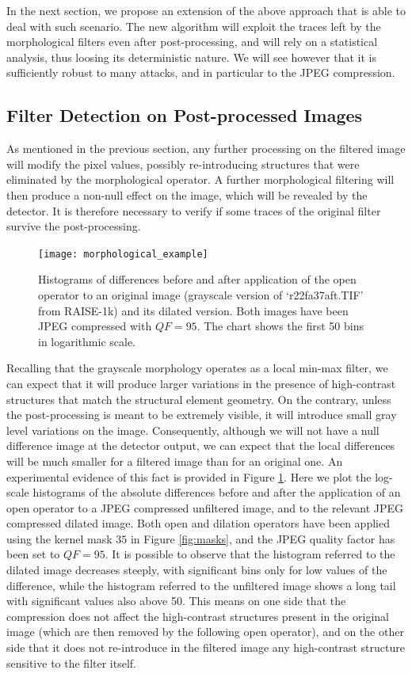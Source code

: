 \documentclass{ieeeaccess}
\begin{document}
In the next section, we propose an extension of the above approach that is able to deal with such scenario. The new algorithm will exploit the traces left by the morphological filters even after post-processing, and will rely on a statistical analysis, thus loosing its deterministic nature. We will see however that it is sufficiently robust to many attacks, and in particular to the JPEG compression.

\subsection{Filter Detection on Post-processed Images}
As mentioned in the previous section, any further processing on the filtered image will modify the pixel values, possibly re-introducing structures that were eliminated by the morphological operator. A further morphological filtering will then produce a non-null effect on the image, which will be revealed by the detector. It is therefore necessary to verify if some traces of the original filter survive the post-processing.
\begin{figure}[!ht]%
	\centering
	\texttt{[image: morphological\_example]}
	\caption{Histograms of differences before and after application of the open operator to an original image (grayscale version of `r22fa37aft.TIF' from RAISE-1k) and its dilated version. Both images have been JPEG compressed with $QF = 95$. The chart shows the first 50 bins in logarithmic scale. }
	\label{fig:differerence_histogram}
\end{figure}

Recalling that the grayscale morphology operates as a local min-max filter, we can expect that it will produce larger variations in the presence of high-contrast structures that match the structural element geometry. On the contrary, unless the post-processing is meant to be extremely visible, it will introduce small gray level variations on the image. Consequently, although we will not have a null difference image at the detector output, we can expect that the local differences will be much smaller for a filtered image than for an original one. An experimental evidence of this fact is provided in Figure \ref{fig:differerence_histogram}. Here we plot the log-scale histograms of the absolute differences before and after the application of an open operator to a JPEG compressed unfiltered image, and to the relevant JPEG compressed dilated image. Both open and dilation operators have been applied using the kernel mask $35$ in Figure \ref{fig:masks}, and the JPEG quality factor has been set to $QF=95$. It is possible to observe that the histogram referred to the dilated image decreases steeply, with significant bins only for low values of the difference, while the histogram referred to the unfiltered image shows a long tail with significant values also above 50. This means on one side that the compression does not affect the high-contrast structures present in the original image (which are then removed by the following open operator), and on the other side that it does not re-introduce in the filtered image any high-contrast structure sensitive to the filter itself.
\end{document}
